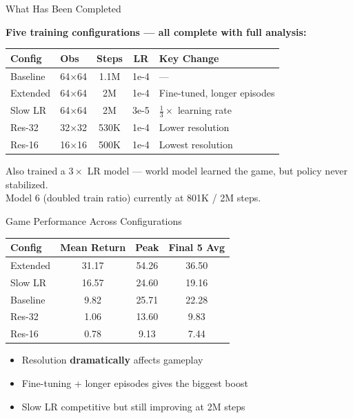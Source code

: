 \documentclass[aspectratio=169]{beamer}
\begin{document}
\begin{frame}{What Has Been Completed}

\textbf{Five training configurations --- all complete with full analysis:}

\begin{table}
\centering
\small
\begin{tabular}{llccl}
\toprule
\textbf{Config} & \textbf{Obs} & \textbf{Steps} & \textbf{LR} & \textbf{Key Change} \\
\midrule
Baseline    & 64$\times$64 & 1.1M & 1e-4 & --- \\
Extended    & 64$\times$64 & 2M   & 1e-4 & Fine-tuned, longer episodes \\
Slow LR     & 64$\times$64 & 2M   & 3e-5 & $\frac{1}{3}\times$ learning rate \\
Res-32      & 32$\times$32 & 530K & 1e-4 & Lower resolution \\
Res-16      & 16$\times$16 & 500K & 1e-4 & Lowest resolution \\
\bottomrule
\end{tabular}
\end{table}

\vspace{0.5em}
Also trained a $3\times$ LR model --- world model learned the game, but policy never stabilized.\\
Model 6 (doubled train ratio) currently at 801K / 2M steps.
\end{frame}

\begin{frame}{Game Performance Across Configurations}

\begin{table}
\centering
\begin{tabular}{lccc}
\toprule
\textbf{Config} & \textbf{Mean Return} & \textbf{Peak} & \textbf{Final 5 Avg} \\
\midrule
Extended    & 31.17 & 54.26 & 36.50 \\
Slow LR     & 16.57 & 24.60 & 19.16 \\
Baseline    &  9.82 & 25.71 & 22.28 \\
Res-32      &  1.06 & 13.60 &  9.83 \\
Res-16      &  0.78 &  9.13 &  7.44 \\
\bottomrule
\end{tabular}
\end{table}

\vspace{0.5em}
\begin{itemize}
    \item Resolution \textbf{dramatically} affects gameplay
    \item Fine-tuning + longer episodes gives the biggest boost
    \item Slow LR competitive but still improving at 2M steps
\end{itemize}
\end{frame}
\end{document}
